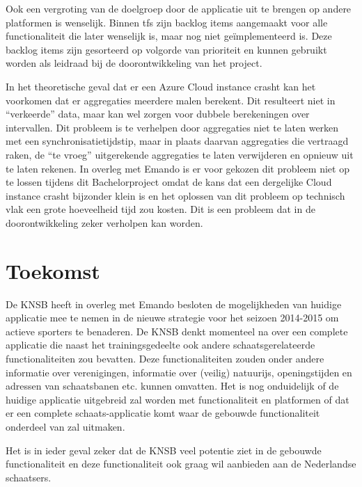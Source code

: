 Ook een vergroting van de doelgroep door de applicatie uit te brengen op andere platformen is wenselijk. Binnen \ac{tfs} zijn backlog items aangemaakt voor alle functionaliteit die later wenselijk is, maar nog niet geïmplementeerd is. Deze backlog items zijn gesorteerd op volgorde van prioriteit en kunnen gebruikt worden als leidraad bij de doorontwikkeling van het project.

In het theoretische geval dat er een Azure Cloud instance crasht kan het voorkomen dat er aggregaties meerdere malen berekent. Dit resulteert niet in ``verkeerde'' data, maar kan wel zorgen voor dubbele berekeningen over intervallen. Dit probleem is te verhelpen door aggregaties niet te laten werken met een synchronisatietijdstip, maar in plaats daarvan aggregaties die vertraagd raken, de ``te vroeg'' uitgerekende aggregaties te laten verwijderen en opnieuw uit te laten rekenen. In overleg met Emando is er voor gekozen dit probleem niet op te lossen tijdens dit Bachelorproject omdat de kans dat een dergelijke Cloud instance crasht bijzonder klein is en het oplossen van dit probleem op technisch vlak een grote hoeveelheid tijd zou kosten. Dit is een probleem dat in de doorontwikkeling zeker verholpen kan worden.

\section{Toekomst}
De \ac{KNSB} heeft in overleg met Emando besloten de mogelijkheden van huidige applicatie mee te nemen in de nieuwe strategie voor het seizoen 2014-2015 om actieve sporters te benaderen. De \ac{KNSB} denkt momenteel na over een complete applicatie die naast het trainingsgedeelte ook andere schaatsgerelateerde functionaliteiten zou bevatten. Deze functionaliteiten zouden onder andere informatie over verenigingen, informatie over (veilig) natuurijs, openingstijden en adressen van schaatsbanen etc. kunnen omvatten. Het is nog onduidelijk of de huidige applicatie uitgebreid zal worden met functionaliteit en platformen of dat er een complete schaats-applicatie komt waar de gebouwde functionaliteit onderdeel van zal uitmaken. 

Het is in ieder geval zeker dat de \ac{KNSB} veel potentie ziet in de gebouwde functionaliteit en deze functionaliteit ook graag wil aanbieden aan de Nederlandse schaatsers.